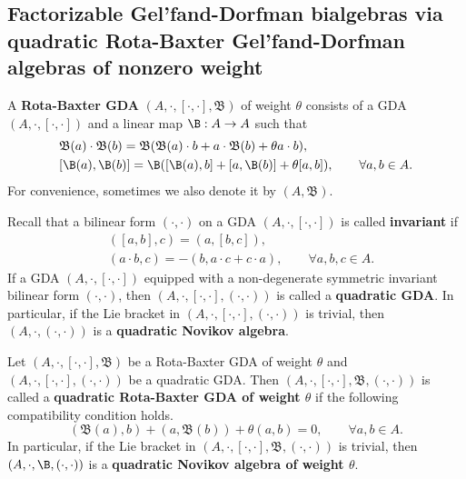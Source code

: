 \documentclass[12pt]{amsart}
\begin{document}
\subsection{Factorizable Gel'fand-Dorfman bialgebras via quadratic  Rota-Baxter  Gel'fand-Dorfman algebras of nonzero weight}


\begin{definition}
A {\bf    Rota-Baxter GDA}
$(A,\cdot,[\cdot,\cdot],\mathfrak{B})$ of weight  $\theta$ consists of  a  GDA
$(A,\cdot,[\cdot,\cdot])$ and a linear map $\B: A\rightarrow A$
such that
\begin{equation}\label{lrb}
    \begin{aligned}
        &\mathfrak{B}(a)\cdot\mathfrak{B}(b)=\mathfrak{B}( \mathfrak{B}(a)\cdot b+a\cdot \mathfrak{B}(b)+\theta a\cdot b ),\\
        &[\B(a),\B(b)]=\B( [\B(a),b]+[a,\B(b)]+\theta[a,b]),\qquad \forall a,b\in A.
    \end{aligned}
\end{equation}
For convenience, sometimes we also denote it by $(A,\mathfrak{B})$.
\end{definition}

 







Recall \cite{HBG} that a bilinear form $(\cdot,\cdot)$ on a GDA $(A,\cdot,[\cdot,\cdot])$ is called {\bf invariant} if
\begin{align}
&([a,b],c)=(a,[b,c]),\\
\label{pn-bf-1}& (a\cdot b,c)=-(b,a\cdot c+c\cdot a), \qquad \forall a,b,c\in A.
\end{align}
If a GDA $(A,\cdot,[\cdot,\cdot])$ equipped with a non-degenerate symmetric invariant bilinear form $(\cdot,\cdot)$,  then $(A,\cdot,[\cdot,\cdot],(\cdot,\cdot))$ is called  a { \bf quadratic GDA}.
In particular, if the Lie bracket in $(A,\cdot,[\cdot,\cdot],(\cdot,\cdot))$  is trivial, then $(A,\cdot,(\cdot,\cdot))$ is a {\bf quadratic Novikov algebra}. 



\begin{definition}
Let $(A,\cdot,[\cdot,\cdot],\mathfrak{B})$ be a Rota-Baxter GDA of
weight  $\theta$ and $(A,\cdot,[\cdot,\cdot],(\cdot,\cdot))$ be a
quadratic GDA. Then $(A,\cdot,[\cdot,\cdot],\mathfrak{B}
,(\cdot,\cdot))$ is called a {\bf quadratic Rota-Baxter GDA of
weight  $\theta$} if  the following compatibility condition holds.
\begin{equation*}
    (\mathfrak{B}(a),b)+    (a, \mathfrak{B}(b))+\theta(a,b)=0,\qquad \forall a,b\in A.
\end{equation*}
In particular, if the Lie bracket in $(A,\cdot,[\cdot,\cdot],\mathfrak{B} ,(\cdot,\cdot))$ is trivial, then $(A,\cdot,\B,(\cdot,\cdot))$ is a {\bf quadratic   Novikov algebra of weight  $\theta$}.
\end{definition}
\end{document}

